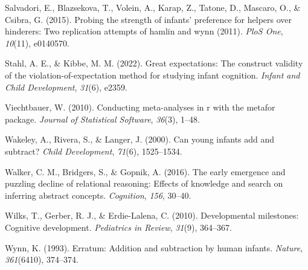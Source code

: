 \documentclass[10pt, letterpaper]{article}
\newenvironment{CSLReferences}%
  {}%
  {\par}
\begin{document}
\begin{CSLReferences}{1}{0}
\leavevmode{}%
Salvadori, E., Blazsekova, T., Volein, A., Karap, Z., Tatone, D.,
Mascaro, O., \& Csibra, G. (2015). Probing the strength of infants'
preference for helpers over hinderers: Two replication attempts of
hamlin and wynn (2011). \emph{PloS One}, \emph{10}(11), e0140570.

\leavevmode{}%
Stahl, A. E., \& Kibbe, M. M. (2022). Great expectations: The construct
validity of the violation-of-expectation method for studying infant
cognition. \emph{Infant and Child Development}, \emph{31}(6), e2359.

\leavevmode{}%
Viechtbauer, W. (2010). Conducting meta-analyses in r with the metafor
package. \emph{Journal of Statistical Software}, \emph{36}(3), 1--48.

\leavevmode{}%
Wakeley, A., Rivera, S., \& Langer, J. (2000). Can young infants add and
subtract? \emph{Child Development}, \emph{71}(6), 1525--1534.

\leavevmode{}%
Walker, C. M., Bridgers, S., \& Gopnik, A. (2016). The early emergence
and puzzling decline of relational reasoning: Effects of knowledge and
search on inferring abstract concepts. \emph{Cognition}, \emph{156},
30--40.

\leavevmode{}%
Wilks, T., Gerber, R. J., \& Erdie-Lalena, C. (2010). Developmental
milestones: Cognitive development. \emph{Pediatrics in Review},
\emph{31}(9), 364--367.

\leavevmode{}%
Wynn, K. (1993). Erratum: Addition and subtraction by human infants.
\emph{Nature}, \emph{361}(6410), 374--374.

\end{CSLReferences}


\end{document}
